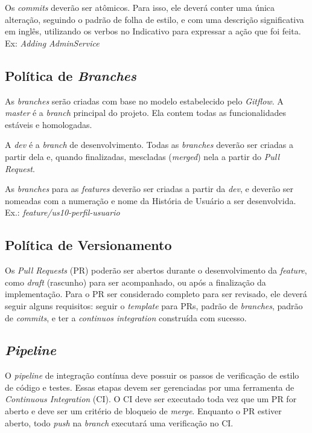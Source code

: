 \begin{apendicesenv}
Os \textit{commits} deverão ser atômicos. Para isso, ele deverá conter uma única alteração,
seguindo o padrão de folha de estilo, e com uma descrição significativa em inglês, utilizando os verbos no Indicativo para expressar a ação que foi feita. Ex: \textit{Adding AdminService}

\subsection*{Política de \textit{Branches}}

As \textit{branches} serão criadas com base no modelo estabelecido pelo \textit{Gitflow}.
A \textit{master} é a \textit{branch} principal do projeto. Ela contem todas as funcionalidades estáveis e homologadas.

A \textit{dev} é a \textit{branch} de desenvolvimento. Todas as \textit{branches}  deverão ser criadas a partir dela e, quando finalizadas, mescladas (\textit{merged}) nela a partir do \textit{Pull Request}.

As \textit{branches} para as \textit{features} deverão ser criadas a partir da \textit{dev}, e deverão ser nomeadas com a numeração e nome da História de Usuário a ser desenvolvida. Ex.:
\textit{feature/us10-perfil-usuario}

\subsection*{Política de Versionamento}

Os \textit{Pull Requests} (PR) poderão ser abertos durante o desenvolvimento da \textit{feature},
como \textit{draft} (rascunho) para ser acompanhado, ou após a finalização da implementação.
Para o PR ser considerado completo para ser revisado, ele deverá seguir alguns requisitos: seguir o \textit{template} para PRs, padrão de \textit{branches}, padrão de \textit{commits}, e ter a \textit{continuos integration} construída com sucesso.

\subsection*{\textit{Pipeline}}

O \textit{pipeline} de integração contínua deve possuir os passos de verificação de estilo de código e testes. Essas etapas devem ser gerenciadas por uma ferramenta de
\textit{Continuous Integration} (CI). O CI deve ser executado toda vez que um PR for aberto e deve ser um critério de bloqueio de \textit{merge}. Enquanto o PR estiver aberto, todo \textit{push} na \textit{branch} executará uma verificação no CI.


\end{apendicesenv}
